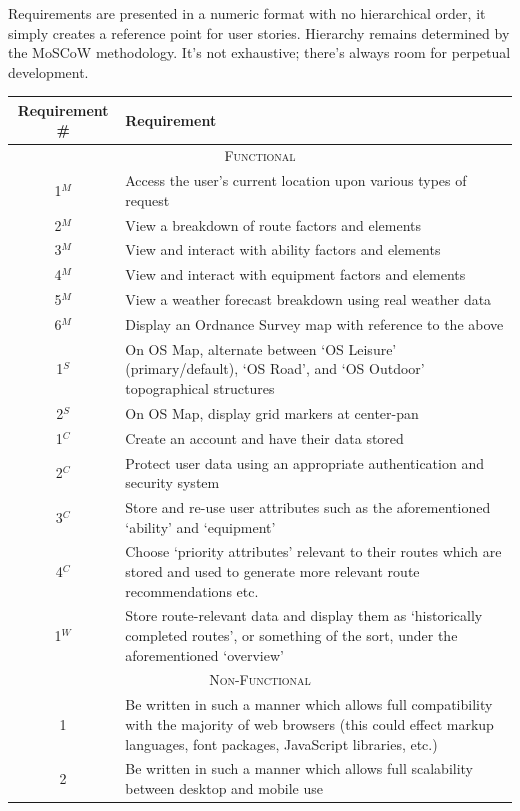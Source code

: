 \documentclass[11pt, english]{article}
\begin{document}
	Requirements are presented in a numeric format with no hierarchical order, it simply creates a reference point for user stories. Hierarchy remains determined by the MoSCoW methodology. It's not exhaustive; there's always room for perpetual development.

	\begin{center}
		\scriptsize
	\begin{longtable}{cp{10cm}}
		Requirement \# & Requirement\\
		\hline
		\multicolumn{2}{c}{\textsc{Functional}}\\
		\hline
		1$^M$ & Access the user's current location upon various types of request\\
		2$^M$ & View a breakdown of route factors and elements\\
		3$^M$ & View and interact with ability factors and elements\\
		4$^M$ & View and interact with equipment factors and elements\\
		5$^M$ & View a weather forecast breakdown using real weather data\\
		6$^M$ & Display an Ordnance Survey map with reference to the above\\
		1$^S$ & On OS Map, alternate between `OS Leisure' (primary/default), `OS Road', and `OS Outdoor' topographical structures\\
		2$^S$ & On OS Map, display grid markers at center-pan\\
		1$^C$ & Create an account and have their data stored\\
		2$^C$ & Protect user data using an appropriate authentication and security system\\
		3$^C$ & Store and re-use user attributes such as the aforementioned `ability' and `equipment'\\
		4$^C$ & Choose `priority attributes' relevant to their routes which are stored and used to generate more relevant route recommendations etc.\\
		1$^W$ & Store route-relevant data and display them as `historically completed routes', or something of the sort, under the aforementioned `overview'\\
		\hline
		\multicolumn{2}{c}{\textsc{Non-Functional}}\\
		\hline
		1 & Be written in such a manner which allows full compatibility with the majority of web browsers (this could effect markup languages, font packages, JavaScript libraries, etc.)\\
		2 & Be written in such a manner which allows full scalability between desktop and mobile use\\

\end{longtable}
\end{center}
\end{document}
